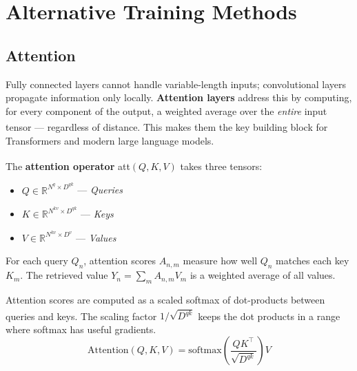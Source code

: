 \section{Alternative Training Methods}

\subsection{Attention}

\begin{tcbitemize}[ skin=sectionraster ]
    \tcbitem[title={Attention: Why It Matters}, raster multicolumn=3]
    Fully connected layers cannot handle variable-length inputs; convolutional layers propagate information only locally.
    \textbf{Attention layers} address this by computing, for every component of the output, a weighted average over the \emph{entire} input tensor --- regardless of distance\textsuperscript{\cite[][p.~73]{fleuretLittleBookDeep}}.
    This makes them the key building block for Transformers and modern large language models.

    \tcbitem[title={Query, Key, Value}, raster multicolumn=3]
    The \textbf{attention operator} att$(Q, K, V)$ takes three tensors\textsuperscript{\cite[][pp.~74--76]{fleuretLittleBookDeep}}:
    \begin{itemize}
        \item $Q \in \mathbb{R}^{N^q \times D^{qk}}$ --- \emph{Queries}
        \item $K \in \mathbb{R}^{N^{kv} \times D^{qk}}$ --- \emph{Keys}
        \item $V \in \mathbb{R}^{N^{kv} \times D^v}$ --- \emph{Values}
    \end{itemize}
    For each query $Q_n$, attention scores $A_{n,m}$ measure how well $Q_n$ matches each key $K_m$.
    The retrieved value $Y_n = \sum_m A_{n,m} V_m$ is a weighted average of all values.

    \tcbitem[title={Scaled Dot-Product Attention}, raster multicolumn=6]
    Attention scores are computed as a scaled softmax of dot-products between queries and keys\textsuperscript{\cite[][p.~3]{vaswaniAttentionAllYou2023}}.
    The scaling factor $1/\!\sqrt{D^{qk}}$ keeps the dot products in a range where softmax has useful gradients.
    \tcblower
    \begin{equation}
        \mathrm{Attention}(Q, K, V)
        = \mathrm{softmax}\!\left(\frac{QK^{\!\top}}{\sqrt{D^{qk}}}\right) V
    \end{equation}


\end{tcbitemize}

